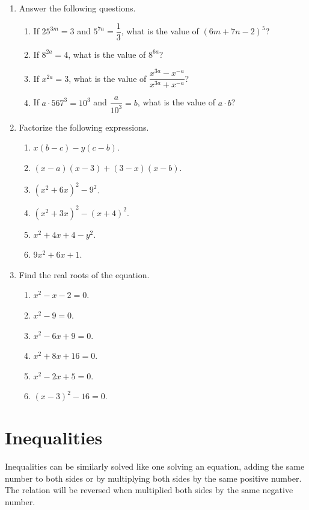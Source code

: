 \documentclass[11pt]{book}
\begin{document}
\begin{enumerate}[label=\arabic*.]
    \item Answer the following questions.
    \begin{enumerate}
        \item If $25^{3m}=3$ and $5^{7n}=\dfrac{1}{3}$, what is the value of $(6m+7n-2)^5$?
        \item If $8^{2a}=4$, what is the value of $8^{6a}$?
        \item If $x^{2a}=3$, what is the value of $\dfrac{x^{3a}-x^{-a}}{x^{3a}+x^{-a}}$?
        \item If $a\cdot567^3=10^3$ and $\dfrac{a}{10^3}=b$, what is the value of $a\cdot b$?
    \end{enumerate}
    \item Factorize the following expressions.
    \begin{multicols}{2}
        \begin{enumerate}
            \item $x(b-c)-y(c-b)$.
            \item $(x-a)(x-3)+(3-x)(x-b)$.
            \item $(x^2+6x)^2-9^2$.
            \item $(x^2+3x)^2-(x+4)^2$.
            \item $x^2+4x+4-y^2$.
            \item $9x^2+6x+1$.
        \end{enumerate}
    \end{multicols}
    \item Find the real roots of the equation.
    \begin{multicols}{2}
        \begin{enumerate}
            \item $x^2-x-2=0$.
            \item $x^2-9=0$.
            \item $x^2-6x+9=0$.
            \item $x^2+8x+16=0$.
            \item $x^2-2x+5=0$.
            \item $(x-3)^2-16=0$.
        \end{enumerate}
    \end{multicols}
\end{enumerate}

\section{Inequalities}

Inequalities can be similarly solved like one solving an equation, adding the same number to both sides or by multiplying both sides by the same positive number. The relation will be reversed when multiplied both sides by the same negative number.
\end{document}

